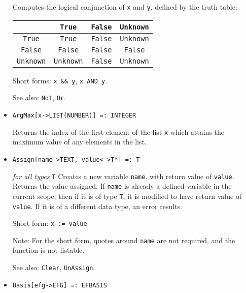\begin{itemize}
\bd
Computes the logical conjunction of \verb+x+ and \verb+y+, defined by the
truth table:
\begin{center}
\begin{tabular} {|c||c|c|c|} \hline
& \verb+True+ & \verb+False+ & \verb+Unknown+ \\ \hline 
\verb+True+ & \verb+True+ & \verb+False+ & \verb+Unknown+ \\
\verb+False+ & \verb+False+ & \verb+False+ & \verb+False+ \\
\verb+Unknown+ & \verb+Unknown+ & \verb+False+ & \verb+Unknown+ \\ \hline
\end{tabular}
\end{center}

\item [Short forms:] \verb+x && y+, \verb+x AND y+.
\item [See also:] \verb+Not+, \verb+Or+.
\ed



\item{} 
\protect \large \begin{verbatim}
ArgMax[x->LIST(NUMBER)] =: INTEGER 
\end{verbatim} \normalsize

\bd 
Returns the index of the first element of the list \verb+x+ which
attains the maximum value of any elements in the list.  
\ed

\item{} 
\protect \large \begin{verbatim}
Assign[name->TEXT, value<->T*] =: T
\end{verbatim} \normalsize

{\it for all types} {\tt T} 
\bd 
Creates a new variable \verb+name+, with return value of \verb+value+.
Returns the value assigned.  If \verb+name+ is already a defined
variable in the current scope, then if it is of type \verb+T+, it is
modified to have return value of \verb+value+.  If it is of a
different data type, an error results.
 
\item [Short form:] \verb+x := value+
\item [Note:] For the short form, quotes around \verb+name+ are not
required, and the function is not listable.
\item [See also:] \verb+Clear+, \verb+UnAssign+.
\ed


\item{}
\protect \large \begin{verbatim}
Basis[efg->EFG] =: EFBASIS
\end{verbatim}\normalsize


\end{itemize}
